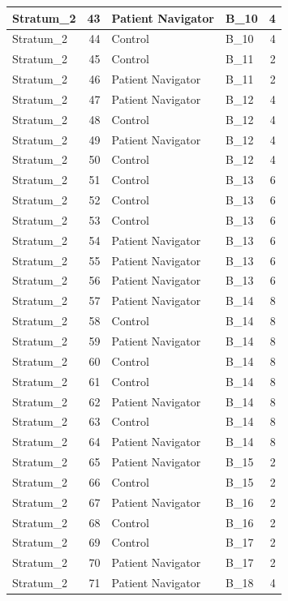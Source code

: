\documentclass[
]{book}
\begin{document}
\begin{table}[H]
\begin{tabular}{l|r|l|l|r}
\hline
Stratum\_2 & 43 & Patient Navigator & B\_10 & 4\\
\hline
Stratum\_2 & 44 & Control & B\_10 & 4\\
\hline
Stratum\_2 & 45 & Control & B\_11 & 2\\
\hline
Stratum\_2 & 46 & Patient Navigator & B\_11 & 2\\
\hline
Stratum\_2 & 47 & Patient Navigator & B\_12 & 4\\
\hline
Stratum\_2 & 48 & Control & B\_12 & 4\\
\hline
Stratum\_2 & 49 & Patient Navigator & B\_12 & 4\\
\hline
Stratum\_2 & 50 & Control & B\_12 & 4\\
\hline
Stratum\_2 & 51 & Control & B\_13 & 6\\
\hline
Stratum\_2 & 52 & Control & B\_13 & 6\\
\hline
Stratum\_2 & 53 & Control & B\_13 & 6\\
\hline
Stratum\_2 & 54 & Patient Navigator & B\_13 & 6\\
\hline
Stratum\_2 & 55 & Patient Navigator & B\_13 & 6\\
\hline
Stratum\_2 & 56 & Patient Navigator & B\_13 & 6\\
\hline
Stratum\_2 & 57 & Patient Navigator & B\_14 & 8\\
\hline
Stratum\_2 & 58 & Control & B\_14 & 8\\
\hline
Stratum\_2 & 59 & Patient Navigator & B\_14 & 8\\
\hline
Stratum\_2 & 60 & Control & B\_14 & 8\\
\hline
Stratum\_2 & 61 & Control & B\_14 & 8\\
\hline
Stratum\_2 & 62 & Patient Navigator & B\_14 & 8\\
\hline
Stratum\_2 & 63 & Control & B\_14 & 8\\
\hline
Stratum\_2 & 64 & Patient Navigator & B\_14 & 8\\
\hline
Stratum\_2 & 65 & Patient Navigator & B\_15 & 2\\
\hline
Stratum\_2 & 66 & Control & B\_15 & 2\\
\hline
Stratum\_2 & 67 & Patient Navigator & B\_16 & 2\\
\hline
Stratum\_2 & 68 & Control & B\_16 & 2\\
\hline
Stratum\_2 & 69 & Control & B\_17 & 2\\
\hline
Stratum\_2 & 70 & Patient Navigator & B\_17 & 2\\
\hline
Stratum\_2 & 71 & Patient Navigator & B\_18 & 4\\

\end{tabular}
\end{table}
\end{document}
